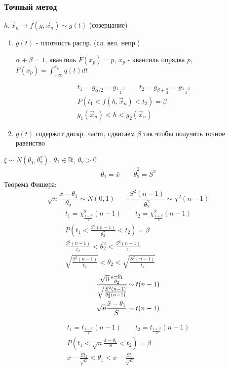 \documentclass{article}
\begin{document}
\subsubsection{Точный метод}
$h, \vec{x}_n \to f(g,\vec{x}_n) \sim g(t)$ (созерцание)
\begin{enumerate}
  \item $g(t)$ - плотность распр. (сл. вел. непр.)

    $\alpha+\beta=1$, квантиль $F(x_{p})=p$, $x_p$ - квантиль порядка $p$, $F(x_p)=\int_{-\infty}^{x_p}q(t)dt$

    \begin{gather*}
      t_1=g_{\alpha/2}=g_{\frac{1-\beta}{2}} \qquad t_2=g_{\beta+\frac{\alpha}{2}}=g_{\frac{1+\beta}{2}} \\ 
      P(t_1<f(h,\vec{x}_n)<t_2)=\beta \\ 
      g_1(\vec{x}_n) < h < g_2(\vec{x}_n)
    \end{gather*}
  \item $g(t)$ содержит дискр. части, сдвигаем $\beta$ так чтобы получить точное равенство
\end{enumerate}
\begin{eg}
  $\xi\sim N(\theta_1, \theta_2^{2})$, $\theta_1\in \mathbb{R}$, $\theta_2>0$
  \begin{gather*}
    \tilde{\theta}_1=\bar{x} \qquad \tilde{\theta}_{2}^{2}=S^{2}
  \end{gather*}
  Теорема Фишера:
  \[
    \sqrt{n}\frac{\bar{x}-\theta_1}{\theta_2} \sim N(0,1) \qquad \frac{S^{2}(n-1)}{\theta_2^{2}} \sim \chi^{2}(n-1) 
  \]
  \begin{gather*}
    t_1=\chi^{2}_{\frac{1-\beta}{2}}(n-1) \qquad t_2=\chi^{2}_{\frac{1+\beta}{2}}(n-1)  \\ 
    P(t_1<\frac{S^{2}(n-1)}{\theta_2^{2}}<t_2) = \beta \\ 
    \frac{S^{2}(n-1)}{t_2} < \theta^{2}_2 < \frac{S^{2}(n-1)}{t_1} \\
    \sqrt{\frac{S^{2}(n-1)}{t_2}} < \theta_2 < \sqrt{\frac{S^{2}(n-1)}{t_1}}
  \end{gather*}
  \begin{gather*}
    \cfrac{\sqrt{n}\frac{\bar{x}-\theta_1}{\theta_2}}{\sqrt{\frac{S^{2}(n-1)}{\theta_2^{2}(n-1)}}} \sim t(n-1) \\ 
    \sqrt{n}\frac{\bar{x}-\theta_1}{S} \sim t(n-1)
  \end{gather*}

  \begin{gather*}
    t_1=t_{\frac{1-\beta}{2}}(n-1) \qquad t_2=t_{\frac{1+\beta}{2}}(n-1) \\ 
    P(t_1 < \sqrt{n}\frac{\bar{x}-\theta_1}{S} < t_2)= \beta \\ 
    \bar{x}-\frac{S t_2}{\sqrt{n}} < \theta_1 < \bar{x} - \frac{S t_1}{\sqrt{n}}
  \end{gather*}
\end{eg}
\end{document}
